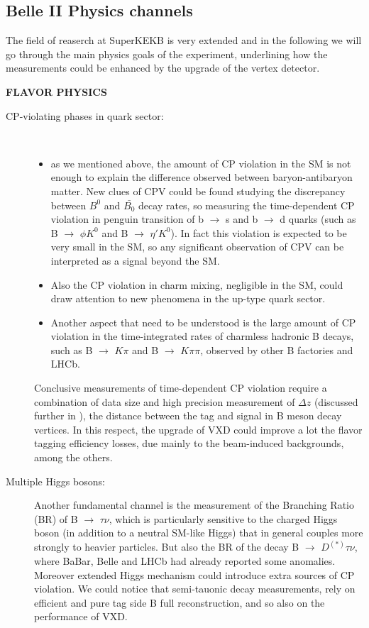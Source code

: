 \subsection{Belle II Physics channels}

The field of reaserch at SuperKEKB is very extended and in the following we will go through the main physics goals of the experiment, underlining how the measurements could be enhanced by the upgrade of the vertex detector.\\

\hspace{.2cm}

\textbf{FLAVOR PHYSICS}
\begin{description}
\item [CP-violating phases in quark sector:]\
	\begin{itemize}
	\item as we mentioned above, the amount of CP violation in the SM is not enough to explain the difference observed between baryon-antibaryon matter. New clues of CPV could be found studying the discrepancy between $B^{0}$ and $\bar{B_{0}}$ decay rates, so measuring the time-dependent CP violation in penguin transition of  b $\rightarrow$ s and  b $\rightarrow$ d quarks (such as B $\rightarrow$ $\phi K^{0}$ and B $\rightarrow$ $\eta' K^{0}$). In fact this violation is expected to be very small in the SM, so any significant observation of CPV can be interpreted as a signal beyond the SM.
	\item Also the CP violation in charm mixing, negligible in the SM, could draw attention to new phenomena in the up-type quark sector.
	\item Another aspect that need to be understood is the large amount of CP violation in the time-integrated rates of charmless hadronic B decays, such as B $\rightarrow$ $K\pi$ and B $\rightarrow$ $K\pi \pi$, observed by other B factories and LHCb. 
	\end{itemize}

Conclusive measurements of time-dependent CP violation require a combination of data size and high precision measurement of $\Delta z$ (discussed further in ), the distance between the tag and signal in B meson decay vertices. In this respect, the upgrade of VXD could improve a lot the flavor tagging efficiency losses, due mainly to the beam-induced backgrounds, among the others.

\item[Multiple Higgs bosons:] Another fundamental channel is the measurement of the Branching Ratio (BR) of B $\rightarrow$ $\tau\nu$, which is particularly sensitive to the charged Higgs boson (in addition to a neutral SM-like Higgs) that in general couples more strongly to heavier particles. But also the BR of the decay B $\rightarrow$ $D^{(*)}$$\tau\nu$, where BaBar, Belle and LHCb had already reported some anomalies. Moreover extended Higgs mechanism could introduce extra sources of CP violation.
We could notice that semi-tauonic decay measurements, rely on efficient and pure tag side B full reconstruction, and so also on the performance of VXD.



\end{description}

